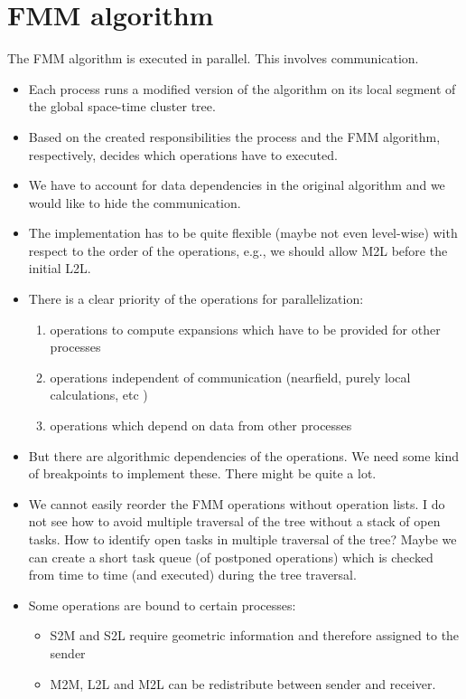 \documentclass[a4paper]{scrartcl}
\begin{document}
  
\section{FMM algorithm}
The FMM algorithm is executed in parallel. This involves communication.
\begin{itemize}
  \item Each process runs a modified version of the algorithm on its local segment
    of the global space-time cluster tree.
  \item Based on the created responsibilities the process and the FMM
    algorithm, respectively, decides which operations have to executed.   
\item We have to account for data dependencies in the original algorithm and we
  would like to hide the communication.
\item The implementation has to be quite flexible (maybe not even level-wise)
  with respect to the order of the operations, e.g., we should allow M2L before
  the initial L2L.
\item There is a clear priority of the operations for parallelization:
  \begin{enumerate}
  \item operations to compute expansions which have to be provided for other processes
  \item operations independent of communication (nearfield, purely local
    calculations, etc )
  \item operations which depend on data from other processes
  \end{enumerate}
\item But there are algorithmic dependencies of the operations. We need
  some kind of breakpoints to implement these. There might be quite a lot.
\item We cannot easily reorder the FMM operations without operation lists.
  I do not see how to avoid multiple traversal of the tree without a stack
  of open tasks. How to identify open tasks in multiple traversal of the tree?
    Maybe we can create a short task queue (of postponed operations) which
    is checked from time to time (and executed) during the tree traversal.
\item Some operations are bound to certain processes:
  \begin{itemize}
  \item S2M and S2L require geometric information and therefore assigned to the
    sender 
  \item M2M, L2L and M2L can be redistribute between sender and receiver.

\end{itemize}
\end{itemize}
\end{document}
